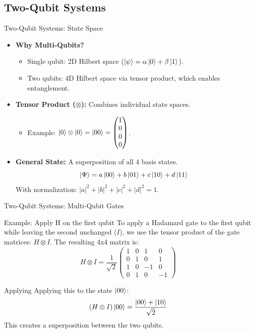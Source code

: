 \documentclass{beamer}
\begin{document}
\subsection{Two-Qubit Systems}
\begin{frame}{Two-Qubit Systems: State Space}
    \begin{itemize}
        \item \textbf{Why Multi-Qubits?}
        \begin{itemize}
            \item Single qubit: 2D Hilbert space ($\ket{\psi} = \alpha \ket{0} + \beta \ket{1}$).
            \item Two qubits: 4D Hilbert space via tensor product, which enables entanglement.
        \end{itemize}
        \bigskip
        \item \textbf{Tensor Product ($\otimes$):} Combines individual state spaces.
        \begin{itemize}
            \item Example: $\ket{0} \otimes \ket{0} = \ket{00} = \begin{pmatrix} 1 \\ 0 \\ 0 \\ 0 \end{pmatrix}$.
        \end{itemize}
        \bigskip
        \item \textbf{General State:} A superposition of all 4 basis states.
        \[ \ket{\Psi} = a \ket{00} + b \ket{01} + c \ket{10} + d \ket{11} \]
        With normalization: $|a|^2 + |b|^2 + |c|^2 + |d|^2 = 1$.
    \end{itemize}
\end{frame}

\begin{frame}{Two-Qubit Systems: Multi-Qubit Gates}
    \begin{block}{Example: Apply H on the first qubit}
        To apply a Hadamard gate to the first qubit while leaving the second unchanged ($I$), we use the tensor product of the gate matrices: $H \otimes I$.
        \vspace{1em}
        The resulting 4x4 matrix is:
        \[
        H \otimes I = \frac{1}{\sqrt{2}} \begin{pmatrix} 1 & 0 & 1 & 0 \\ 0 & 1 & 0 & 1 \\ 1 & 0 & -1 & 0 \\ 0 & 1 & 0 & -1 \end{pmatrix}
        \]
        \vspace{1em}
    \end{block}
    \begin{block}{Applying}
        Applying this to the state $\ket{00}$:
        \[ 
        (H \otimes I) \ket{00} = \frac{\ket{00} + \ket{10}}{\sqrt{2}}
        \]
        This creates a superposition between the two qubits.
    \end{block}
\end{frame}
\end{document}
